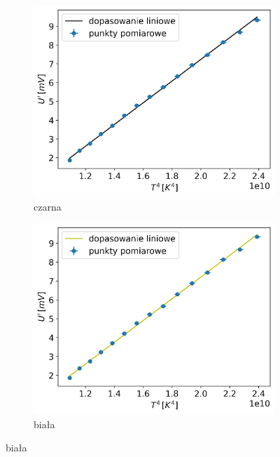 \documentclass[12pt]{article}
\begin{document}
\begin{figure}[H]
    \centering
    \begin{subfigure}{0.45\textwidth}
        \centering
        \includegraphics[width=\linewidth]{cube_black}
        \caption{czarna}
        \label{fig:cube_black}
    \end{subfigure}
    \hfill
    \begin{subfigure}{0.45\textwidth}
        \centering
        \includegraphics[width=\linewidth]{cube_white}
        \caption{biała}
        \label{fig:cube_white}
    \end{subfigure}
    

\end{figure}
\end{document}
